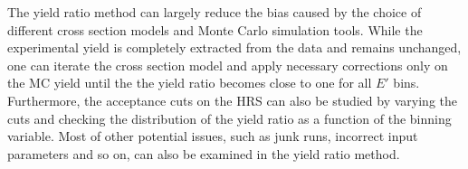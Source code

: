 The yield ratio method can largely reduce the bias caused by the choice of different cross section models and Monte Carlo simulation tools. While the experimental yield is completely extracted from the data and remains unchanged, one can iterate the cross section model and apply necessary corrections only on the MC yield until the the yield ratio becomes close to one for all $E'$ bins. Furthermore, the acceptance cuts on the HRS can also be studied by varying the cuts and checking the distribution of the yield ratio as a function of the binning variable. Most of other potential issues, such as junk runs, incorrect input parameters and so on, can also be examined in the yield ratio method.


